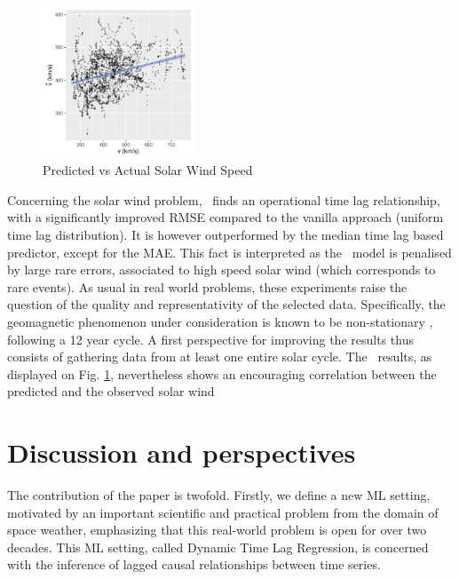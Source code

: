 \begin{figure}
  \centering
  \includegraphics[width=0.4\textwidth]{figures/test_scatter_v}
  \caption{Predicted vs Actual Solar Wind Speed} 
  \label{fig:sw_preds}
\end{figure}

Concerning the solar wind problem, \XX\ finds an operational time lag relationship, with a significantly improved RMSE compared to the vanilla approach (uniform time lag distribution). It is however outperformed by the median time lag based predictor, except for the MAE. This fact is interpreted as the \XX\ model is penalised 
by large rare errors, associated to high speed solar wind (which corresponds to rare events). As usual in real world problems, these experiments raise the question of the quality and representativity of the selected data. Specifically, the geomagnetic phenomenon under consideration is known to be non-stationary \citep{nonstationarysolarwind}, following a 12 year cycle. A first perspective for improving the results thus consists of gathering data from at least one entire solar cycle. 
The \XX\ results, as displayed on Fig. \ref{fig:sw_preds}, nevertheless shows an encouraging correlation between the predicted and the observed solar wind


\section{Discussion and perspectives}
The contribution of the paper is twofold. Firstly, we define a new ML setting, motivated by an important scientific and practical problem from the domain of space weather, emphasizing that this real-world problem is open for over two decades. This ML setting, called Dynamic Time Lag Regression, is concerned with the inference of lagged causal relationships between time series. 

